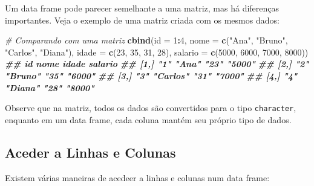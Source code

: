 \documentclass[
]{book}
\newenvironment{Shaded}{\begin{snugshade}}{\end{snugshade}}
\newcommand{\AttributeTok}[1]{\textcolor[rgb]{0.13,0.29,0.53}{#1}}
\newcommand{\CommentTok}[1]{\textcolor[rgb]{0.56,0.35,0.01}{\textit{#1}}}
\newcommand{\DecValTok}[1]{\textcolor[rgb]{0.00,0.00,0.81}{#1}}
\newcommand{\DocumentationTok}[1]{\textcolor[rgb]{0.56,0.35,0.01}{\textbf{\textit{#1}}}}
\newcommand{\FunctionTok}[1]{\textcolor[rgb]{0.13,0.29,0.53}{\textbf{#1}}}
\newcommand{\NormalTok}[1]{#1}
\newcommand{\SpecialCharTok}[1]{\textcolor[rgb]{0.81,0.36,0.00}{\textbf{#1}}}
\newcommand{\StringTok}[1]{\textcolor[rgb]{0.31,0.60,0.02}{#1}}
\begin{document}
Um data frame pode parecer semelhante a uma matriz, mas há diferenças
importantes. Veja o exemplo de uma matriz criada com os mesmos dados:

\begin{Shaded}
\begin{Highlighting}[]
\CommentTok{\# Comparando com uma matriz}
\FunctionTok{cbind}\NormalTok{(}\AttributeTok{id =} \DecValTok{1}\SpecialCharTok{:}\DecValTok{4}\NormalTok{,}
\AttributeTok{nome =} \FunctionTok{c}\NormalTok{(}\StringTok{"Ana"}\NormalTok{, }\StringTok{"Bruno"}\NormalTok{, }\StringTok{"Carlos"}\NormalTok{, }\StringTok{"Diana"}\NormalTok{),}
\AttributeTok{idade =} \FunctionTok{c}\NormalTok{(}\DecValTok{23}\NormalTok{, }\DecValTok{35}\NormalTok{, }\DecValTok{31}\NormalTok{, }\DecValTok{28}\NormalTok{),}
\AttributeTok{salario =} \FunctionTok{c}\NormalTok{(}\DecValTok{5000}\NormalTok{, }\DecValTok{6000}\NormalTok{, }\DecValTok{7000}\NormalTok{, }\DecValTok{8000}\NormalTok{))}
\DocumentationTok{\#\#      id  nome     idade salario}
\DocumentationTok{\#\# [1,] "1" "Ana"    "23"  "5000" }
\DocumentationTok{\#\# [2,] "2" "Bruno"  "35"  "6000" }
\DocumentationTok{\#\# [3,] "3" "Carlos" "31"  "7000" }
\DocumentationTok{\#\# [4,] "4" "Diana"  "28"  "8000"}
\end{Highlighting}
\end{Shaded}

Observe que na matriz, todos os dados são convertidos para o tipo
\texttt{character}, enquanto em um data frame, cada coluna mantém seu próprio
tipo de dados.

\subsection{Aceder a Linhas e Colunas}\label{aceder-a-linhas-e-colunas}

Existem várias maneiras de acedeer a linhas e colunas num data frame:
\end{document}
